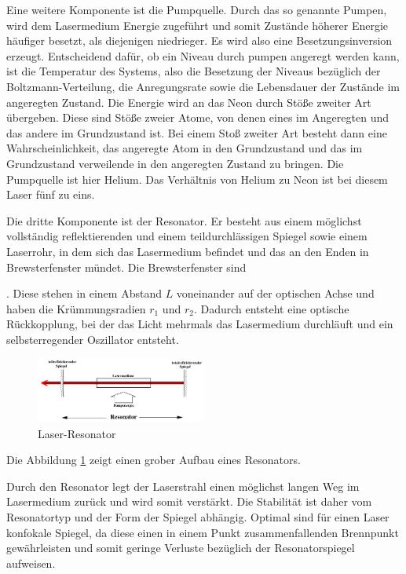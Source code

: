 \noindent Eine weitere Komponente ist die Pumpquelle. Durch das so genannte Pumpen, wird dem Lasermedium Energie zugeführt und somit Zustände höherer Energie häufiger besetzt, als diejenigen niedrieger. Es wird also eine Besetzungsinversion erzeugt. Entscheidend dafür, ob ein Niveau durch pumpen angeregt werden kann, ist die Temperatur des Systems, also die Besetzung der Niveaus bezüglich der Boltzmann-Verteilung, die Anregungsrate sowie die Lebensdauer der Zustände im angeregten Zustand. Die Energie wird an das Neon durch Stöße zweiter Art übergeben. Diese sind Stöße zweier Atome, von denen eines im Angeregten und das andere im Grundzustand ist. Bei einem Stoß zweiter Art besteht dann eine Wahrscheinlichkeit, das angeregte Atom in den Grundzustand und das im Grundzustand verweilende in den angeregten Zustand zu bringen. Die Pumpquelle ist hier Helium. Das Verhältnis von Helium zu Neon ist bei diesem Laser fünf zu eins.

\noindent Die dritte Komponente ist der Resonator. Er besteht aus einem möglichst vollständig reflektierenden und einem teildurchlässigen Spiegel sowie einem Laserrohr, in dem sich das Lasermedium befindet und das an den Enden in Brewsterfenster mündet. Die Brewsterfenster sind 


. Diese stehen in einem Abstand \(L\)  voneinander auf der optischen Achse und haben die Krümmungsradien \(r_1\) und \(r_2\). Dadurch entsteht eine optische Rückkopplung, bei der das Licht mehrmals das Lasermedium durchläuft und ein selbsterregender Oszillator entsteht. 

\begin{figure}
	\centering
	\includegraphics[width=0.5\textwidth]{resonator}
	\caption{Laser-Resonator}
	\label{fig:resonator}
\end{figure}

\noindent Die Abbildung \ref{fig:resonator} zeigt einen grober Aufbau eines Resonators.

\noindent Durch den Resonator legt der Laserstrahl einen möglichst langen Weg im Lasermedium zurück und wird somit verstärkt. Die Stabilität ist daher vom Resonatortyp und der Form der Spiegel abhängig. Optimal sind für einen Laser konfokale Spiegel, da diese einen in einem Punkt zusammenfallenden Brennpunkt gewährleisten und somit geringe Verluste bezüglich der Resonatorspiegel aufweisen.

